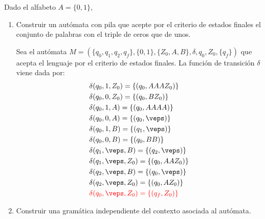 \begin{ejercicio}\label{ej:1.5.17}
    Dado el alfabeto $A = \{0,1\}$,
    \begin{enumerate}
        \item Construir un autómata con pila que acepte por el criterio de estados finales el conjunto de palabras con el triple de ceros que de unos.
        
        Sea el autómata $M = (\{q_0,q_1,q_2,q_f\},\{0,1\},\{Z_0,A,B\},\delta,q_0,Z_0,\{q_f\})$ que acepta el lenguaje por el criterio de estados finales. La función de transición $\delta$ viene dada por:
        \begin{align*}
            &\delta(q_0,1,Z_0) = \{(q_0,AAAZ_0)\} \\
            &\delta(q_0,0,Z_0) = \{(q_0,BZ_0)\} \\
            &\delta(q_0,1,A) = \{(q_0,AAAA)\} \\
            &\delta(q_0,0,A) = \{(q_0,\veps)\} \\
            &\delta(q_0,1,B) = \{(q_1,\veps)\} \\
            &\delta(q_0,0,B) = \{(q_0,BB)\} \\
            &\delta(q_1,\veps,B) = \{(q_2,\veps)\} \\
            &\delta(q_1,\veps,Z_0) = \{(q_0,AAZ_0)\} \\
            &\delta(q_2,\veps,B) = \{(q_0,\veps)\} \\
            &\delta(q_2,\veps,Z_0) = \{(q_0,AZ_0)\}\\
            &\red{\delta(q_0,\veps,Z_0) = \{(q_f,Z_0)\}}
        \end{align*}
        \item Construir una gramática independiente del contexto asociada al autómata.
        
    \end{enumerate}
\end{ejercicio}

